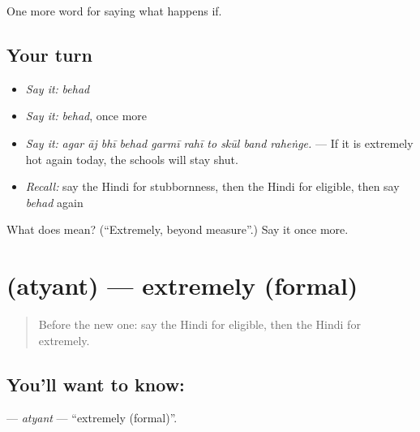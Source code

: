 \begin{grammarlens}[title={What you've built}]
One more word for saying what happens if.
\end{grammarlens}

\subsection*{Your turn}
\begin{itemize}
\raggedright
  \item \emph{Say it:} \emph{behad}
  \item \emph{Say it:} \emph{behad}, once more
  \item \emph{Say it:} \emph{agar āj bhī behad garmī rahī to skūl band raheṅge.} — If it is extremely hot again today, the schools will stay shut.
  \item \emph{Recall:} say the Hindi for stubbornness, then the Hindi for eligible, then say \emph{behad} again
\end{itemize}

\begin{tcolorbox}[breakable,colback=teal!4,colframe=teal!35!black,title={Before you move on}]
What does  mean? (\textquotedblleft{}Extremely, beyond measure\textquotedblright{}.) Say it once more.
\end{tcolorbox}
\section[\texorpdfstring{\hi{अत्यंत} (atyant)}{अत्यंत (atyant)}]{ (atyant) — extremely (formal)}

\label{lesson:HI-C387-atyant}



\begin{quote}
Before the new one: say the Hindi for eligible, then the Hindi for extremely.
\end{quote}

\subsection*{You'll want to know: }
\textbf{} — \emph{atyant} — \textquotedblleft{}extremely (formal)\textquotedblright{}.

\begin{quote}
            
\end{quote}

